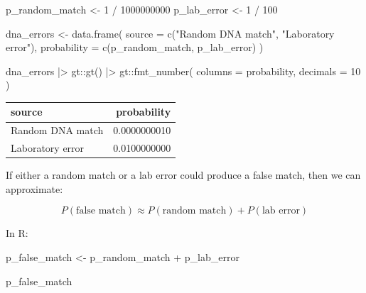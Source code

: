 \documentclass[
  letterpaper,
  DIV=11,
  numbers=noendperiod]{scrreprt}
\newenvironment{Shaded}{\begin{snugshade}}{\end{snugshade}}
\newcommand{\AttributeTok}[1]{\textcolor[rgb]{0.40,0.45,0.13}{#1}}
\newcommand{\DecValTok}[1]{\textcolor[rgb]{0.68,0.00,0.00}{#1}}
\newcommand{\FunctionTok}[1]{\textcolor[rgb]{0.28,0.35,0.67}{#1}}
\newcommand{\NormalTok}[1]{\textcolor[rgb]{0.00,0.23,0.31}{#1}}
\newcommand{\OtherTok}[1]{\textcolor[rgb]{0.00,0.23,0.31}{#1}}
\newcommand{\SpecialCharTok}[1]{\textcolor[rgb]{0.37,0.37,0.37}{#1}}
\newcommand{\StringTok}[1]{\textcolor[rgb]{0.13,0.47,0.30}{#1}}
\begin{document}
\begin{Shaded}
\begin{Highlighting}[]
\NormalTok{p\_random\_match }\OtherTok{\textless{}{-}} \DecValTok{1} \SpecialCharTok{/} \DecValTok{1000000000}
\NormalTok{p\_lab\_error }\OtherTok{\textless{}{-}} \DecValTok{1} \SpecialCharTok{/} \DecValTok{100}

\NormalTok{dna\_errors }\OtherTok{\textless{}{-}} \FunctionTok{data.frame}\NormalTok{(}
  \AttributeTok{source =} \FunctionTok{c}\NormalTok{(}\StringTok{"Random DNA match"}\NormalTok{, }\StringTok{"Laboratory error"}\NormalTok{),}
  \AttributeTok{probability =} \FunctionTok{c}\NormalTok{(p\_random\_match, p\_lab\_error)}
\NormalTok{)}

\NormalTok{dna\_errors }\SpecialCharTok{|\textgreater{}}
\NormalTok{  gt}\SpecialCharTok{::}\FunctionTok{gt}\NormalTok{() }\SpecialCharTok{|\textgreater{}}
\NormalTok{  gt}\SpecialCharTok{::}\FunctionTok{fmt\_number}\NormalTok{(}
    \AttributeTok{columns =}\NormalTok{ probability,}
    \AttributeTok{decimals =} \DecValTok{10}
\NormalTok{  )}
\end{Highlighting}
\end{Shaded}

\begin{table}
\fontsize{12.0pt}{14.0pt}\selectfont
\begin{tabular*}{\linewidth}{@{\extracolsep{\fill}}lr}
\toprule
source & probability \\ 
\midrule\addlinespace[2.5pt]
Random DNA match & 0.0000000010 \\ 
Laboratory error & 0.0100000000 \\ 
\bottomrule
\end{tabular*}
\end{table}

If either a random match or a lab error could produce a false match,
then we can approximate:

\[P(\text{false match})
\approx
P(\text{random match}) + P(\text{lab error})\]

In R:

\begin{Shaded}
\begin{Highlighting}[]
\NormalTok{p\_false\_match }\OtherTok{\textless{}{-}}\NormalTok{ p\_random\_match }\SpecialCharTok{+}\NormalTok{ p\_lab\_error}

\NormalTok{p\_false\_match}
\end{Highlighting}
\end{Shaded}
\end{document}
